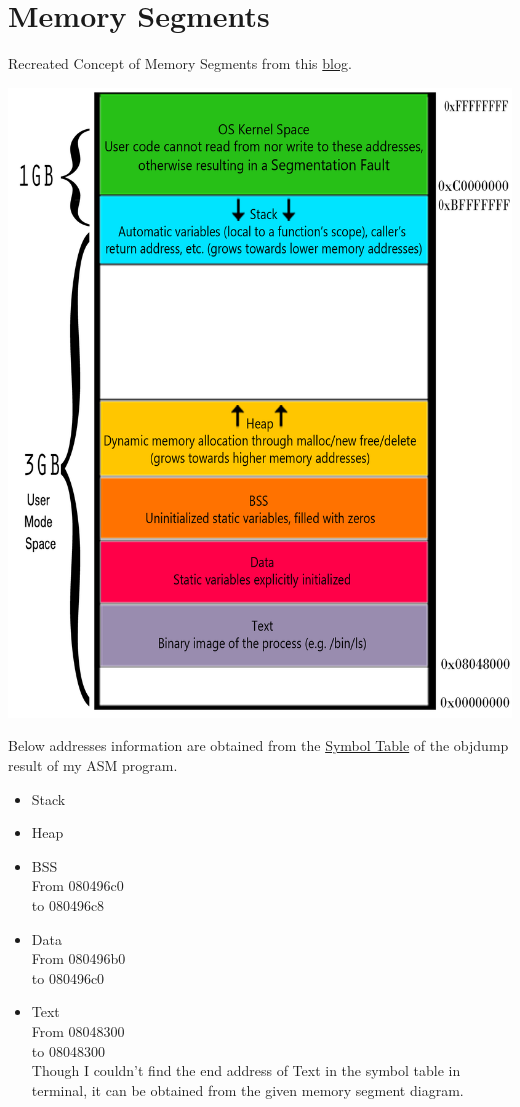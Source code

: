 \documentclass{article}
\begin{document}
\section*{Memory Segments}
Recreated Concept of Memory Segments from this \href{http://goo.gl/SbQhnH}{blog}.\\
\begin{minipage}{11cm}
\includegraphics[scale=0.5]{memory.PNG}
\end{minipage}
\begin{minipage}{7cm}
Below addresses information are obtained from the \hyperlink{st}{Symbol Table} of the objdump result of my ASM program.
\begin{itemize}
\item
Stack\\
\item
Heap\\
\item
BSS\\
From 080496c0 \\
to 080496c8
\item
Data\\
From 080496b0 \\
to 080496c0
\item
Text\\
From 08048300 \\
to 08048300 \\
Though I couldn't find the end address of Text in the symbol table in terminal, it can be obtained from the given memory segment diagram. 
\end{itemize}
\end{minipage}
\clearpage
\end{document}
